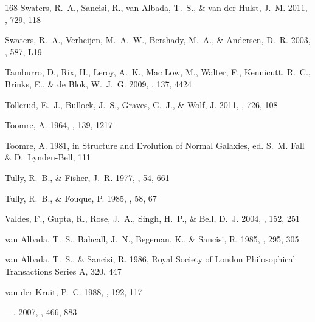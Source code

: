 \documentclass[apj,iop,numberedappendix]{emulateapj}
\begin{document}
\begin{thebibliography}{168}
{Swaters}, R.~A., {Sancisi}, R., {van Albada}, T.~S., \& {van der Hulst}, J.~M.
  2011, \apj, 729, 118

{Swaters}, R.~A., {Verheijen}, M.~A.~W., {Bershady}, M.~A., \& {Andersen},
  D.~R. 2003{}, \apjl, 587, L19

{Tamburro}, D., {Rix}, H., {Leroy}, A.~K., {Mac Low}, M., {Walter}, F.,
  {Kennicutt}, R.~C., {Brinks}, E., \& {de Blok}, W.~J.~G. 2009, \aj, 137, 4424

{Tollerud}, E.~J., {Bullock}, J.~S., {Graves}, G.~J., \& {Wolf}, J. 2011, \apj,
  726, 108

{Toomre}, A. 1964, \apj, 139, 1217

{Toomre}, A. 1981, in Structure and Evolution of Normal Galaxies, ed. S.~M.
  {Fall} \& D.~{Lynden-Bell}, 111

{Tully}, R.~B., \& {Fisher}, J.~R. 1977, \aap, 54, 661

{Tully}, R.~B., \& {Fouque}, P. 1985, \apjs, 58, 67

{Valdes}, F., {Gupta}, R., {Rose}, J.~A., {Singh}, H.~P., \& {Bell}, D.~J.
  2004, \apjs, 152, 251

{van Albada}, T.~S., {Bahcall}, J.~N., {Begeman}, K., \& {Sancisi}, R. 1985,
  \apj, 295, 305

{van Albada}, T.~S., \& {Sancisi}, R. 1986, Royal Society of London
  Philosophical Transactions Series A, 320, 447

{van der Kruit}, P.~C. 1988, \aap, 192, 117

---. 2007, \aap, 466, 883


\end{thebibliography}
\end{document}
